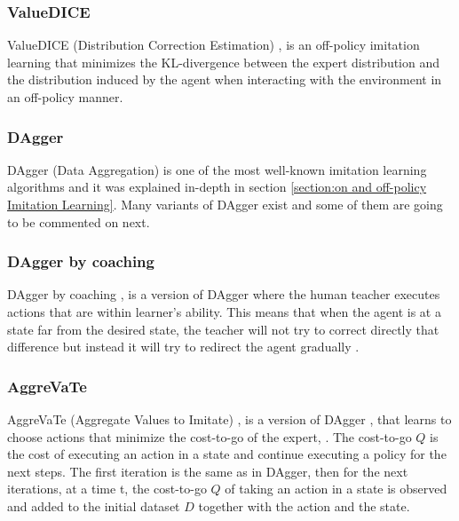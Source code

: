 \subsubsection*{ValueDICE}
ValueDICE (Distribution Correction Estimation) \cite{ValueDICE-Kostrikov:2019}, is an off-policy imitation learning \cite{Laskey:phdthesis} that minimizes the KL-divergence between the expert distribution and the distribution induced by the agent when interacting with the environment in an off-policy manner.


\subsubsection*{DAgger}
DAgger (Data Aggregation) \cite{DAgger-Ross:2011} is one of the most well-known imitation learning algorithms and it was explained in-depth in section \ref{section:on and off-policy Imitation Learning}. Many variants of DAgger exist and some of them are going to be commented on next.



\subsubsection*{DAgger by coaching}
DAgger by coaching \cite{DAgger-by-coaching-He-DaumeIII-Eisner:2012},  is a version of DAgger \cite{DAgger-Ross:2011} where the human teacher executes actions that are within learner’s ability. This means that when the agent is at a state far from the desired state, the teacher will not try to correct directly that difference but instead it will try to redirect the agent gradually \cite{Global-overview-Attia:2018}.


\subsubsection*{AggreVaTe}
AggreVaTe (Aggregate Values to Imitate) \cite{AggreVaTe-Ross-Bagnell:2014}, is a version of DAgger \cite{DAgger-Ross:2011}, that learns to choose actions that minimize the cost-to-go of the expert, 
\cite{Global-overview-Attia:2018}. The cost-to-go $Q$ is the cost of executing an action in a state and continue executing a policy for the next steps. The first iteration is the same as in DAgger, then for the next iterations,  at a time t, the cost-to-go $Q$ of taking an action in a state is observed and added to the initial dataset $D$ together with the action and the state.



